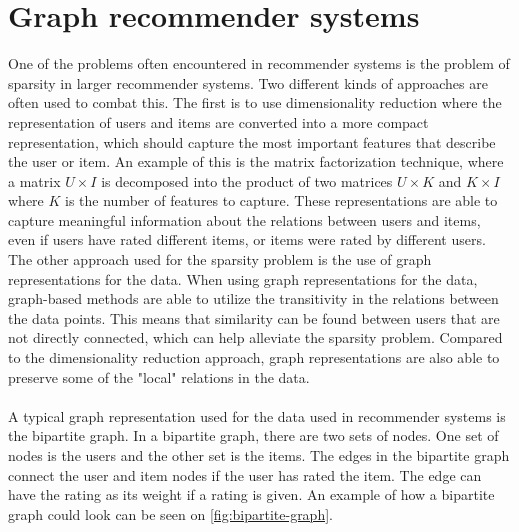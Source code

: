 \section{Graph recommender systems}
One of the problems often encountered in recommender systems is the problem of sparsity in larger recommender systems.
Two different kinds of approaches are often used to combat this. 
The first is to use dimensionality reduction where the representation of users and items are converted into a more compact representation, which should capture the most important features that describe the user or item.
An example of this is the matrix factorization technique, where a matrix $U \times I$ is decomposed into the product of two matrices $U \times K $ and $ K \times I$ where $K$ is the number of features to capture.
These representations are able to capture meaningful information about the relations between users and items, even if users have rated different items, or items were rated by different users. 
The other approach used for the sparsity problem is the use of graph representations for the data.
When using graph representations for the data, graph-based methods are able to utilize the transitivity in the relations between the data points. 
This means that similarity can be found between users that are not directly connected, which can help alleviate the sparsity problem.
Compared to the dimensionality reduction approach, graph representations are also able to preserve some of the "local" relations in the data\cite{RecommenderHandbook2015}.
\\\\
A typical graph representation used for the data used in recommender systems is the bipartite graph.
In a bipartite graph, there are two sets of nodes.
One set of nodes is the users and the other set is the items.
The edges in the bipartite graph connect the user and item nodes if the user has rated the item. 
The edge can have the rating as its weight if a rating is given.
An example of how a bipartite graph could look can be seen on \autoref{fig:bipartite-graph}.
